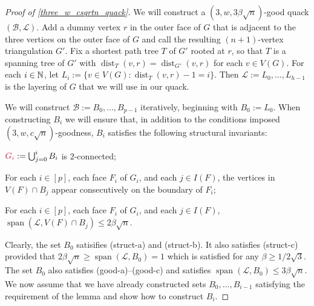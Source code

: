 \documentclass{patmorin}
\makeatletter
\def\mathcolor#1#{\@mathcolor{#1}}
\def\@mathcolor#1#2#3{%
  \protect\leavevmode
  \begingroup
    \color#1{#2}#3%
  \endgroup
}
\newcommand{\mathdefin}[1]{\mathcolor{brightmaroon}{#1}}
\DeclareMathOperator{\spn}{span}
\DeclareMathOperator{\dist}{dist}
\makeatother
\begin{document}



\begin{proof}[Proof of \cref{three_w_csqrtn_quack}]
  We will construct a  $(3,w,3\beta\sqrt{n})$-good quack $(\mathcal{B},\mathcal{L})$.
  Add a dummy vertex $r$ in the outer face of $G$ that is adjacent to the three vertices on the outer face of $G$ and call the resulting $(n+1)$-vertex triangulation $G'$.  Fix a shortest path tree $T$ of $G'$ rooted at $r$, so that $T$ is a spanning tree of $G'$ with $\dist_T(v,r)=\dist_{G'}(v,r)$ for each $v\in V(G)$.  For each $i\in\mathbb{N}$, let $L_i:=\{v\in V(G):\dist_T(v,r)-1=i\}$.  Then $\mathcal{L}:=L_0,\ldots,L_{h-1}$ is the layering of $G$ that we will use in our quack.

  We will construct $\mathcal{B}:=B_0,\ldots,B_{p-1}$ iteratively, beginning with $B_0:=L_0$.  When constructing $B_i$ we will ensure that, in addition to the conditions imposed $(3,w,c\sqrt{n})$-goodness, $B_i$ satisfies the following structural invariants:
  \begin{compactenum}[({struct}-a)]
    \item $\mathdefin{G_i}:=\bigcup_{j=0}^i B_i$ is $2$-connected;
    \item For each $i\in[p]$, each face $F_i$ of $G_i$, and each $j\in I(F)$,  the vertices in $V(F)\cap B_j$ appear consecutively on the boundary of $F_i$;
    \item For each $i\in[p]$, each face $F_i$ of $G_i$, and each $j\in I(F)$, $\spn(\mathcal{L},V(F)\cap B_j)\le 2\beta\sqrt{n}$.
  \end{compactenum}

  Clearly, the set $B_0$ satisifies (struct-a) and (struct-b). It also satisfies (struct-c) provided that $2\beta\sqrt{n} \ge \spn(\mathcal{L},B_0)=1$ which is satisfied for any $\beta\ge 1/2\sqrt{3}$.  The set $B_0$ also satisfies (good-a)--(good-c) and satisfies $\spn(\mathcal{L},B_0)\le 3\beta\sqrt{n}$.  We now assume that we have already constructed sets $B_0,\ldots,B_{i-1}$ satisfying the requirement of the lemma and show how to construct $B_i$.


\end{proof}
\end{document}

